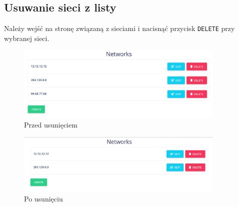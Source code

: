\documentclass[a4paper,11pt]{article}
\begin{document}
\subsection{Usuwanie sieci z listy}
Należy wejść na stronę związaną z sieciami i nacisnąć przycisk \texttt{DELETE} przy wybranej sieci.
\begin{figure}[H]
	\centering
	\includegraphics[width=10cm]{instr03.png}
	\caption{Przed usunięciem}
\end{figure}

\begin{figure}[H]
	\centering
	\includegraphics[width=10cm]{intsr01.png}
	\caption{Po usunięciu}
\end{figure}
\end{document}
